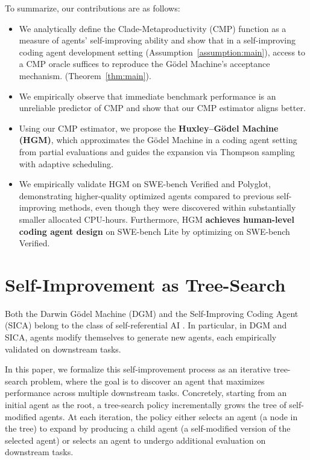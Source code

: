 \documentclass{article} %
\begin{document}
To summarize, our contributions are as follows: 
\begin{itemize}[leftmargin=*,topsep=0em,itemsep=0em]
    \item We analytically define the Clade-Metaproductivity ($\mathrm{CMP}$) function as a measure of agents' self-improving ability and show that in a self-improving coding agent development setting (Assumption~\ref{assumption:main}), access to a $\mathrm{CMP}$ oracle suffices to reproduce the G\"odel Machine’s acceptance mechanism. (Theorem~\ref{thm:main}).
    \item We empirically observe that immediate benchmark performance is an unreliable predictor of $\mathrm{CMP}$ and show that our $\mathrm{CMP}$ estimator aligns better.
    \item Using our $\mathrm{CMP}$ estimator, we propose the \textbf{Huxley–G\"odel Machine (HGM)}, which approximates the G\"odel Machine in a coding agent setting from partial evaluations and guides the expansion via Thompson sampling with adaptive scheduling.
    \item We empirically validate HGM on SWE-bench Verified and Polyglot, demonstrating higher-quality optimized agents compared to previous self-improving methods, even though they were discovered within substantially smaller allocated CPU-hours. Furthermore, HGM \textbf{achieves human-level coding agent design} on SWE-bench Lite by optimizing on SWE-bench Verified. 
\end{itemize}



\section{Self-Improvement as Tree-Search}\label{sec:self-improvement}
Both the Darwin G\"odel Machine (DGM) and the Self-Improving Coding Agent (SICA) belong to the class of self-referential AI \citep{Schmidhuber1987EvolutionaryPI,Schmidhuber:03gm}. In particular, in DGM and SICA, agents modify themselves to generate new agents, each empirically validated on downstream tasks. 

In this paper, we formalize this self-improvement process as an iterative tree-search problem, where the goal is to discover an agent that maximizes performance across multiple downstream tasks. Concretely, starting from an initial agent as the root, a tree-search policy incrementally grows the tree of self-modified agents. At each iteration, the policy either selects an agent (a node in the tree) to expand by producing a child agent (a self-modified version of the selected agent) or selects an agent to undergo additional evaluation on downstream tasks.
\end{document}
